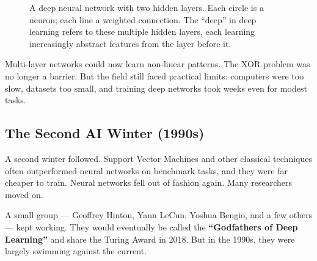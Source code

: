 \begin{figure}[htb]
\centering
{}
\caption{A deep neural network with two hidden layers. Each circle is a neuron; each line a weighted connection. The ``deep'' in deep learning refers to these multiple hidden layers, each learning increasingly abstract features from the layer before it.}
\end{figure}

Multi-layer networks could now learn non-linear patterns.
The XOR problem was no longer a barrier.
But the field still faced practical limits: computers were too slow, datasets too small, and training deep networks took weeks even for modest tasks.

\subsection{The Second AI Winter (1990s)}

A second winter followed.
Support Vector Machines and other classical techniques often outperformed neural networks on benchmark tasks, and they were far cheaper to train.
Neural networks fell out of fashion again.
Many researchers moved on.

A small group --- Geoffrey Hinton, Yann LeCun, Yoshua Bengio, and a few others --- kept working.
They would eventually be called the \textbf{``Godfathers of Deep Learning''} and share the Turing Award in 2018.
But in the 1990s, they were largely swimming against the current.
